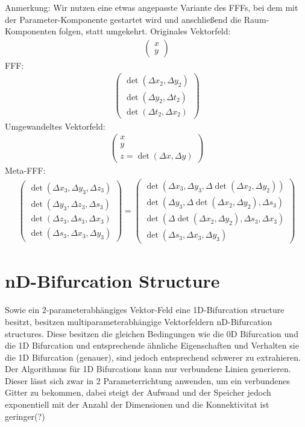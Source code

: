 \documentclass[11pt]{article}
\begin{document}
Anmerkung: Wir nutzen eine etwas angepasste Variante des FFFs, bei dem mit der Parameter-Komponente gestartet wird und anschließend die Raum-Komponenten folgen, statt umgekehrt. 
\newpage
Originales Vektorfeld:
\begin{align}
\begin{pmatrix}x\\y\end{pmatrix}
\end{align}
FFF:
\begin{align}
\begin{pmatrix}\det(\Delta x_2,\Delta y_2)\\\det(\Delta y_2,\Delta t_2)\\\det(\Delta t_2,\Delta x_2)\end{pmatrix}
\end{align}
Umgewandeltes Vektorfeld:
\begin{align}
\begin{pmatrix}x\\y\\z = \det(\Delta x,\Delta y)\end{pmatrix}
\end{align}
Meta-FFF:
\begin{align}
\begin{pmatrix}\det(\Delta x_3,\Delta y_3,\Delta z_3)\\\det(\Delta y_3,\Delta z_3,\Delta s_3)\\\det(\Delta z_3,\Delta s_3,\Delta x_3)\\\det(\Delta s_3,\Delta x_3,\Delta y_3)\end{pmatrix} =
\begin{pmatrix}\det(\Delta x_3,\Delta y_3,\Delta \det(\Delta x_2,\Delta y_2))\\\det(\Delta y_3,\Delta \det(\Delta x_2,\Delta y_2),\Delta s_3)\\\det(\Delta \det(\Delta x_2,\Delta y_2),\Delta s_3,\Delta x_3)\\\det(\Delta s_3,\Delta x_3,\Delta y_3)\end{pmatrix}
\end{align}


\section{nD-Bifurcation Structure}
Sowie ein 2-parameterabhängiges Vektor-Feld eine 1D-Bifurcation structure besitzt, besitzen multiparameterabhängige Vektorfeldern nD-Bifurcation structures.
Diese besitzen die gleichen Bedingungen wie die 0D Bifurcation und die 1D Bifurcation und entsprechende ähnliche Eigenschaften und Verhalten sie die 1D Bifurcation (genauer), sind jedoch entsprechend schwerer zu extrahieren. Der Algorithmus für 1D Bifurcations kann nur verbundene Linien generieren. Dieser lässt sich zwar in 2 Parameterrichtung anwenden, um ein verbundenes Gitter zu bekommen, dabei steigt der Aufwand und der Speicher jedoch exponentiell mit der Anzahl der Dimensionen und die Konnektivitat ist geringer(?)
\end{document}
